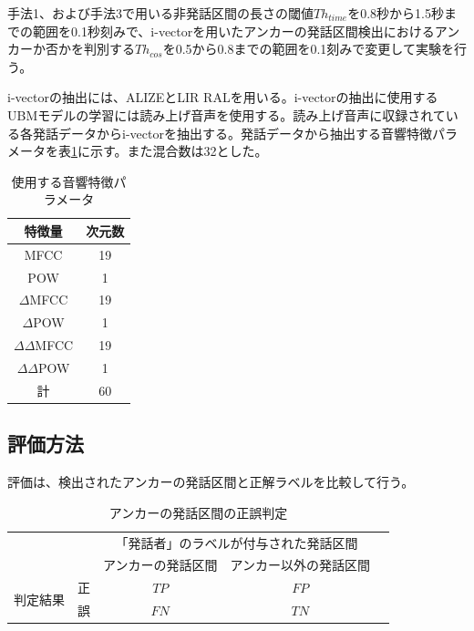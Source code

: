手法1、および手法3で用いる非発話区間の長さの閾値$Th_{time}$を0.8秒から1.5秒までの範囲を0.1秒刻みで、i-vectorを用いたアンカーの発話区間検出におけるアンカーか否かを判別する$Th_{cos}$を0.5から0.8までの範囲を0.1刻みで変更して実験を行う。\par
i-vectorの抽出には、ALIZEとLIR RALを用いる。i-vectorの抽出に使用するUBMモデルの学習には読み上げ音声\cite{ATR}を使用する。読み上げ音声に収録されている各発話データからi-vectorを抽出する。発話データから抽出する音響特徴パラメータを表\ref{iv_feature2}に示す。また混合数は32とした。\par

\begin{table}[H]
  \begin{center}
    \caption{使用する音響特徴パラメータ \label{iv_feature2}}
    \begin{tabular}{|c||c|} \hline
      特徴量 & 次元数\\ \hline
      MFCC & 19  \\ 
      POW & 1  \\ 
      $\Delta$MFCC & 19 \\ 
      $\Delta$POW & 1 \\ 
      $\Delta\Delta$MFCC & 19 \\ 
      $\Delta\Delta$POW & 1 \\ \hline
      計 & 60 \\ \hline
    \end{tabular}
  \end{center}
\end{table}

\subsection{評価方法}
評価は、検出されたアンカーの発話区間と正解ラベルを比較して行う。

\begin{table}[H]
\begin{center}
    \caption{アンカーの発話区間の正誤判定 \label{table:clustering}}
\begin{tabular}{|c|c|c|c|l}
\cline{1-4}
\multicolumn{2}{|c|}{\multirow{2}{*}{}} & \multicolumn{2}{c|}{「発話者」のラベルが付与された発話区間} &  \\ \cline{3-4}
\multicolumn{2}{|c|}{}                  & アンカーの発話区間        & アンカー以外の発話区間        &  \\ \cline{1-4}
\multirow{2}{*}{判定結果}        & 正        & $TP$                  & $FP$                   &  \\ \cline{2-4}
& 誤        & $FN$                  & $TN$                   &  \\ \cline{1-4}
\end{tabular}
\end{center}
\end{table}

